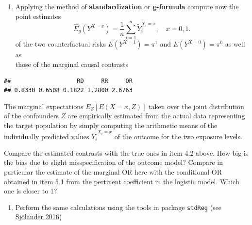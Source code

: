 \documentclass[
]{book}
\newenvironment{Shaded}{\begin{snugshade}}{\end{snugshade}}
\newcommand{\DecValTok}[1]{\textcolor[rgb]{0.00,0.00,0.81}{#1}}
\newcommand{\FunctionTok}[1]{\textcolor[rgb]{0.13,0.29,0.53}{\textbf{#1}}}
\newcommand{\NormalTok}[1]{#1}
\newcommand{\OtherTok}[1]{\textcolor[rgb]{0.56,0.35,0.01}{#1}}
\newcommand{\SpecialCharTok}[1]{\textcolor[rgb]{0.81,0.36,0.00}{\textbf{#1}}}
\providecommand{\tightlist}{%
  \setlength{\itemsep}{0pt}\setlength{\parskip}{0pt}}
\begin{document}
\begin{enumerate}
\def\labelenumi{\arabic{enumi}.}
\setcounter{enumi}{2}
\tightlist
\item
  Applying the method of \textbf{standardization} or
  \textbf{g-formula} compute now the
  point estimates
  \[ \widehat{E}_g(Y^{X=x}) =
   \frac{1}{n} \sum_{i=1}^n \widetilde{Y}_i^{X_i=x}, \quad x=0,1. \]
  of the two counterfactual risks \(E(Y^{X=1}) = \pi^1\) and
  \(E(Y^{X=0})=\pi^0\) as well as\\
  those of the marginal causal contrasts
\end{enumerate}

\begin{Shaded}
\end{Shaded}

\begin{verbatim}
##                   RD     RR     OR 
## 0.8330 0.6508 0.1822 1.2800 2.6763
\end{verbatim}

The marginal expectations \(E_Z[E(X=x, Z)]\) taken over the
joint distribution of
the confounders \(Z\) are empirically estimated from
the actual data representing the target population by simply
computing the arithmetic means of the individually
predicted values \(\widetilde{Y_i}^{X_i=x}\) of the
outcome for the two exposure levels.

Compare the estimated contrasts with the true ones in
item 4.2 above.
How big is the bias due to slight misspecification
of the outcome model?
Compare in particular the estimate of the marginal
OR here with the
conditional OR obtained in item 5.1 from the
pertinent coefficient in
the logistic model. Which one is closer to 1?

\begin{enumerate}
\def\labelenumi{\arabic{enumi}.}
\setcounter{enumi}{3}
\tightlist
\item
  Perform the same calculations using the tools
  in package \texttt{stdReg}
  (see \href{https://doi.org/10.1007/s10654-016-0157-3}{Sjölander 2016})
\end{enumerate}
\end{document}
